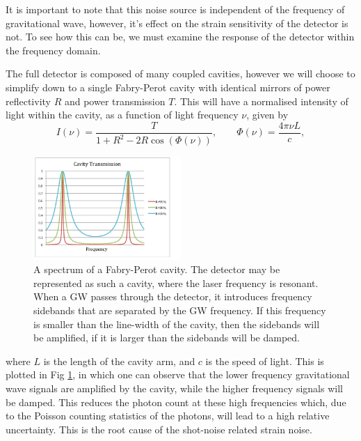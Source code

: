 \documentclass[aps,  
                a4paper, 
                amsmath, 
                amssymb, 
                preprint,
                tightenlines,  
                amsfonts,
                nofootinbib,
                onecolumn,
                titlepage,
                10pt
            ]{revtex4-2}
\begin{document}
    It is important to note that this noise source is independent of the frequency of gravitational wave, however, it's effect on the strain sensitivity of the detector is not. To see how this can be, we must examine the response of the detector within the frequency domain.
    \par
    The full detector is composed of many coupled cavities, however we will choose to simplify down to a single Fabry-Perot cavity with identical mirrors of power reflectivity $R$ and power transmission $T$. This will have a normalised intensity of light within the cavity, as a function of light frequency $\nu$, given by
    \begin{equation}
        \label{eq:fabry-perot-intracavity-intensity}
        I(\nu)=\frac{T}{1+R^2-2R\cos{(\Phi(\nu))}}, \qquad \Phi(\nu)=\frac{4\pi\nu L}{c},
    \end{equation}
    \begin{figure}
        \centering
        \includegraphics[width=0.5\textwidth]{img/fabry-perot.png}
        \caption{A spectrum of a Fabry-Perot cavity\cite{wharton2011}. The detector may be represented as such a cavity, where the laser frequency is resonant. When a GW passes through the detector, it introduces frequency sidebands that are separated by the GW frequency. If this frequency is smaller than the line-width of the cavity, then the sidebands will be amplified, if it is larger than the sidebands will be damped.}
        \label{fig:fabry-perot-spectrum}
    \end{figure}    
    where $L$ is the length of the cavity arm, and $c$ is the speed of light. This is plotted in Fig \ref{fig:fabry-perot-spectrum}, in which one can observe that the lower frequency gravitational wave signals are amplified by the cavity, while the higher frequency signals will be damped. This reduces the photon count at these high frequencies which, due to the Poisson counting statistics of the photons, will lead to a high relative uncertainty. This is the root cause of the shot-noise related strain noise.
\end{document}
